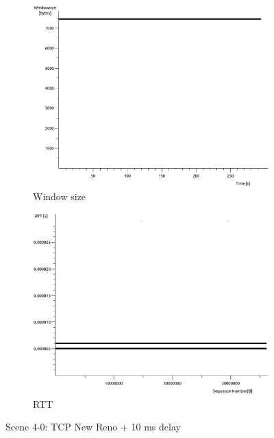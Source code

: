 \documentclass[conference,a4paper]{IEEEtran}
\begin{document}
\begin{figure}
\begin{subfigure}[b]{0.2\textwidth}
  \includegraphics[width=\textwidth]{s4-0_wnd}
  \caption{Window size}
 \end{subfigure}
 \begin{subfigure}[b]{0.2\textwidth}
  \includegraphics[width=\textwidth]{s4-0_rtt}
  \caption{RTT}
 \end{subfigure}
 \caption{Scene 4-0: TCP New Reno + 10 ms delay}
\end{figure}
\end{document}
